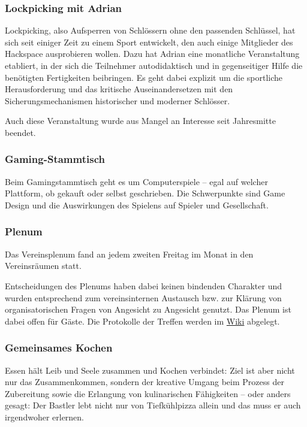 \documentclass[ngerman]{scrartcl}
\begin{document}
\subsubsection{Lockpicking mit Adrian}

Lockpicking, also Aufsperren von Schlössern ohne den passenden
Schlüssel, hat sich seit einiger Zeit zu einem Sport entwickelt, den
auch einige Mitglieder des Hackspace ausprobieren wollen. Dazu hat
Adrian eine monatliche Veranstaltung etabliert, in der sich die Teilnehmer
autodidaktisch und in gegenseitiger Hilfe die benötigten Fertigkeiten
beibringen. Es geht dabei explizit um die sportliche Herausforderung
und das kritische Auseinandersetzen mit den Sicherungsmechanismen
historischer und moderner Schlösser.

Auch diese Veranstaltung wurde aus Mangel an Interesse seit Jahresmitte beendet. 

\subsubsection{Gaming-Stammtisch}

Beim Gamingstammtisch geht es um Computerspiele -- egal auf welcher Plattform, ob gekauft oder selbst geschrieben.
Die Schwerpunkte sind Game Design und die Auswirkungen des Spielens auf Spieler und Gesellschaft. 

\subsubsection{Plenum}

Das Vereinsplenum fand an jedem zweiten Freitag im Monat in den
Vereinsräumen statt.

Entscheidungen des Plenums haben dabei keinen bindenden Charakter und
wurden entsprechend zum vereinsinternen Austausch bzw. zur Klärung von
organisatorischen Fragen von Angesicht zu Angesicht genutzt. Das Plenum ist dabei offen für Gäste.
Die Protokolle der Treffen werden im \href{https://www.krautspace.de/hswiki:verein:plenum:start}{Wiki} abgelegt.

\subsubsection{Gemeinsames Kochen}

Essen hält Leib und Seele zusammen und Kochen verbindet:
Ziel ist aber nicht nur das Zusammenkommen, sondern der kreative Umgang
beim Prozess der Zubereitung sowie die Erlangung von kulinarischen
Fähigkeiten -- oder anders gesagt: Der Bastler lebt nicht nur von
Tiefkühlpizza allein und das muss er auch irgendwoher erlernen.
\end{document}
